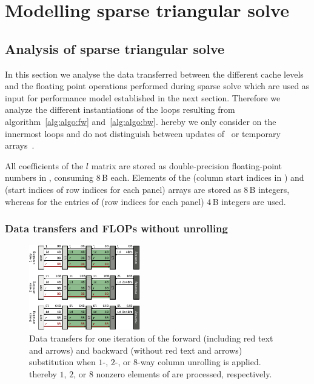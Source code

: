 \chapter{Modelling sparse triangular solve}

\section{Analysis of sparse triangular solve} 
\label{sec:sds}

In this section we analyse the data transferred between the different cache levels
and the floating point operations performed during sparse solve which are used
as input for performance model established in the next section.
%
Therefore we analyze the different instantiations of the loops resulting from
algorithm~\ref{alg:algo:fw} and~\ref{alg:algo:bw}.
hereby we only consider on the innermost loops and do not 
distinguish between updates of~\vr{} or temporary arrays~\vtemp{}.

All coefficients of the $l$ matrix are stored as double-precision floating-point
numbers in \vlnz{}, consuming $8$\,B each. 
Elements of the \vxlnz{} (column start indices in \vlnz{}) and \vxindx{} (start
indices of row indices for each panel) arrays are stored as $8$\,B integers,
whereas for the entries of \vindx{} (row indices for each panel) $4$\,B integers
are used.

\subsection{Data transfers and FLOPs without unrolling}
\label{sec:pm:dt}
\label{sec:pm:dt:wou}

\begin{figure}[t]
  \centering
 \includegraphics[width=0.43\textwidth,clip=true]{images/ecm-datatransfers}
  \caption{Data transfers for one iteration of the forward
    (including red text and arrows) and backward (without red text and arrows)
    substitution when $1$-, $2$-, or $8$-way column unrolling is applied.
    thereby $1$, $2$, or $8$ nonzero elements of \vlnz{} are processed,
    respectively.
  }
  \label{fig:ecm:data}
\end{figure}

